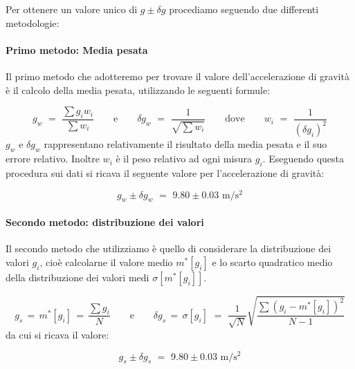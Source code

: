 Per ottenere un valore unico di $g \pm \delta g$ procediamo seguendo due differenti metodologie:

\paragraph{Primo metodo: Media pesata\\}

Il primo metodo che adotteremo per trovare il valore dell'accelerazione di gravità è il calcolo della media pesata, utilizzando le seguenti formule:

\begin{equation*}
g_w \,\, = \,\, \frac{\sum g_iw_i}{\sum w_i} \quad\quad \text{e} \quad\quad \delta g_w \,\, = \,\, \frac{1}{\sqrt{\sum w_i}} \quad\quad \text{dove} \quad\quad w_i \,\, = \,\, \frac{1}{(\delta g_i)^2}
\end{equation*}
%
$g_w$ e $\delta g_w$ rappresentano relativamente il risultato della media pesata e il suo errore relativo. Inoltre $w_i$ è il peso relativo ad ogni misura $g_i$.
Eseguendo questa procedura sui dati si ricava il seguente valore per l'accelerazione di gravità:

\begin{equation}
g_w \pm \delta g_w \,\, = \,\, 9.80 \pm 0.03 \,\, \si{\metre\per\square\second}
\end{equation}

\paragraph{Secondo metodo: distribuzione dei valori\\}

Il secondo metodo che utilizziamo è quello di considerare la distribuzione dei valori $g_i$, cioè calcolarne il valore medio $m^*[g_i]$ e lo scarto quadratico medio della distribuzione dei valori medi $\sigma[m^*[g_i]]$.

\begin{equation*}
g_s \, = \, m^*[g_i] \, = \, \frac{\sum g_i}{N} \quad\quad \text{e} \quad\quad \delta g_s \, = \, \sigma[g_i] \,\, = \,\, \frac{1}{\sqrt{N}}\sqrt{\frac{\sum (g_i - m^*[g_i])^2}{N-1}}
\end{equation*}
%
da cui si ricava il valore:

\begin{equation}
g_s \pm \delta g_s \,\, = \,\, 9.80 \pm 0.03 \,\, \si{\metre\per\square\second}
\end{equation}

